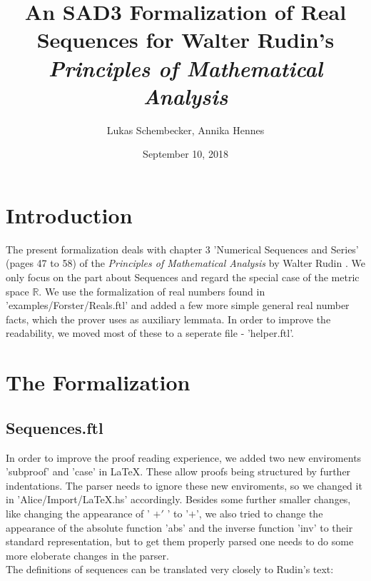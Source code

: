 \documentclass{article}
\begin{document}
\title{An SAD3 Formalization of Real Sequences for Walter Rudin's
\it{Principles of Mathematical Analysis}}

\author{Lukas Schembecker, Annika Hennes}

\date{September 10, 2018}

\maketitle


\section{Introduction}
The present formalization deals with chapter 3 'Numerical Sequences and Series' (pages 47 to 58) of the {\it Principles of Mathematical Analysis} by Walter \linebreak Rudin \cite{Rudin}. We only focus on the part about Sequences and regard the special case of the metric space $\mathbb{R}$. We use the formalization of real numbers found in 'examples/Forster/Reals.ftl' and added a few more simple general real number facts, which the prover uses as auxiliary lemmata. In order to improve the readability, we moved most of these to a seperate file - 'helper.ftl'.

\section{The Formalization}
\subsection{Sequences.ftl}

In order to improve the proof reading experience, we added two new enviroments 'subproof' and 'case' in LaTeX. These allow proofs being structured by further indentations. The parser needs to ignore these new enviroments, so we changed it in 'Alice/Import/LaTeX.hs' accordingly. Besides some further smaller changes, like changing the appearance of ' $+'$ ' to '$+$', we also tried to change the appearance of the absolute function 'abs' and the inverse function 'inv' to their standard representation, but to get them properly parsed one needs to do some more eloberate changes in the parser.\\

\noindent The definitions of sequences can be translated very closely to Rudin's text:
\end{document}
